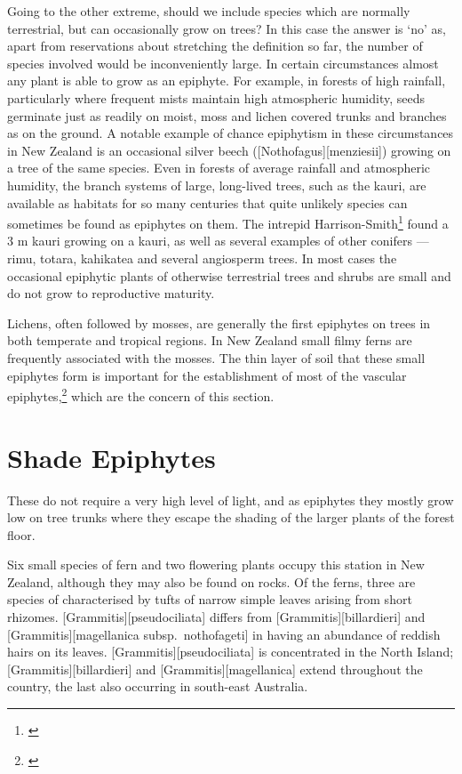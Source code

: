 Going to the other extreme, should we include species which are normally terrestrial, but can occasionally grow on trees? In this case the answer is `no' as, apart from reservations about stretching the definition so far, the number of species involved would be inconveniently large.
In certain circumstances almost any plant is able to grow as an epiphyte.
For example, in forests of high rainfall, particularly where frequent mists maintain high atmospheric humidity, seeds germinate just as readily on moist, moss and lichen covered trunks and branches as on the ground.
A notable example of chance epiphytism in these circumstances in New Zealand is an occasional silver beech ([Nothofagus][menziesii]) growing on a tree of the same species.
Even in forests of average rainfall and atmospheric humidity, the branch systems of large, long-lived trees, such as the kauri, are available as habitats for so many centuries that quite unlikely species can sometimes be found as epiphytes on them.
The intrepid Harrison-Smith\footnote{\cite{harrisonsmith1938kauri}} found a 3 m kauri growing on a kauri, as well as several examples of other conifers --- rimu, totara, kahikatea and several angiosperm trees.
In most cases the occasional epiphytic plants of otherwise terrestrial trees and shrubs are small and do not grow to reproductive maturity.

Lichens, often followed by mosses, are generally the first epiphytes on trees in both temperate and tropical regions.
In New Zealand small filmy ferns are frequently associated with the mosses.
The thin layer of soil that these small epiphytes form is important for the establishment of most of the vascular epiphytes,\footnote{\cite{oliver1930new}} which are the concern of this section.

\section{Shade Epiphytes}

These do not require a very high level of light, and as epiphytes they mostly grow low on tree trunks where they escape the shading of the larger plants of the forest floor.

Six small species of fern and two flowering plants occupy this station in New Zealand, although they may also be found on rocks.
Of the ferns, three are species of  characterised by tufts of narrow simple leaves arising from short rhizomes. [Grammitis][pseudociliata] differs from [Grammitis][billardieri] and [Grammitis][magellanica subsp.\ nothofageti] in having an abundance of reddish hairs on its leaves. [Grammitis][pseudociliata] is concentrated in the North Island; [Grammitis][billardieri] and [Grammitis][magellanica] extend throughout the country, the last also occurring in south-east Australia.

